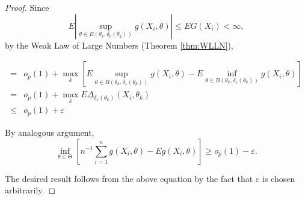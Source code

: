 \begin{proof}
    Since
    \begin{equation*}
        E\left|\sup_{\theta\in B\left(\theta_{k},\delta_{c}\left(\theta_{k}\right)\right)}g\left(X_{i},\theta\right)\right|\leq EG\left(X_{i}\right)<\infty,
    \end{equation*}
    by the Weak Law of Large Numbers (Theorem \ref{thm:WLLN}),

    \begin{equation*}
        \begin{aligned}
            =    & o_{p}(1)+\max_{k}\left[E\sup_{\theta\in B\left(\theta_{k},\delta_{\varepsilon}\left(\theta_{k}\right)\right)}g\left(X_{i},\theta\right)-E\inf_{\theta\in B\left(\theta_{k},\delta_{\varepsilon}\left(\theta_{k}\right)\right)}g\left(X_{i},\theta\right)\right] \\
            =    & o_{p}(1)+\max_{k}E\Delta_{\delta_{\varepsilon}\left(\theta_{k}\right)}\left(X_{i},\theta_{k}\right)                                                                                                                                                             \\
            \leq & o_{p}(1)+\varepsilon
        \end{aligned}
    \end{equation*}

    By analogous argument,
    \begin{equation*}
        \inf_{\theta\in\Theta}\left[n^{-1}\sum_{i=1}^{n}g\left(X_{i},\theta\right)-Eg\left(X_{i},\theta\right)\right]\geq o_{p}(1)-\varepsilon.
    \end{equation*}

    The desired result follows from the above equation by the fact that $\varepsilon$ is chosen arbitrarily.
\end{proof}
